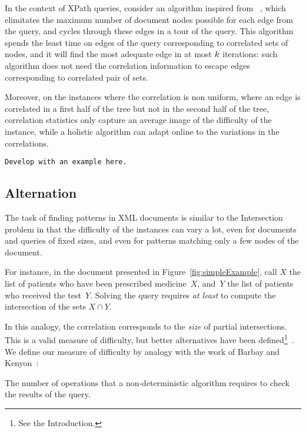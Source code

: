 In the context of XPath queries, consider an algorithm inspired from
~\cite{dlmAlenex}, which elimitates the maximum
number of document nodes possible for each edge from the query, and
cycles through these edges in a tour of the query.
%
This algorithm spends the least time on edges of the query
corresponding to correlated sets of nodes, and it will find the most
adequate edge in at most $k$ iterations: such algorithm does
not need the correlation information to escape edges corresponding to
correlated pair of sets.

Moreover, on the instances where the correlation is non uniform, where
an edge is correlated in a first half of the tree but not in the
second half of the tree, correlation statistics only capture an
average image of the difficulty of the instance, while a holistic
algorithm can adapt online to the variations in the correlations.

\begin{verbatim}
Develop with an example here.
\end{verbatim}



\subsection{Alternation}

The task of finding patterns in XML documents is similar to the
Intersection problem in that the difficulty of the instances can vary
a lot, even for documents and queries of fixed sizes, and even for
patterns matching only a few nodes of the document.
%
\begin{EXAMPLE}
  For instance, in the document presented in
  Figure~\ref{fig:simpleExample}, call $X$ the list of patients who
  have been prescribed medicine~$X$, and~$Y$ the list of patients who
  received the test~$Y$.
  Solving the query requires {\em at least} to compute the
  intersection of the sets $X\cap Y$.
\end{EXAMPLE}
%
In this analogy, the correlation corresponds to the {\em size} of
partial intersections.
%
This is a valid measure of difficulty, but better alternatives have
been defined\footnote{See the
Introduction.}~\cite{dlm,adaptiveIntersectionAndTThresholdProblems,optimalityOfRandomizedAlgorithmsForTheIntersectionProblem}.
%
We define our measure of difficulty by analogy with the work of Barbay
and Kenyon~\cite{adaptiveIntersectionAndTThresholdProblems}:
%
\begin{definition}
The number of operations that a non-deterministic algorithm requires
to check the results of the query.
\end{definition}

